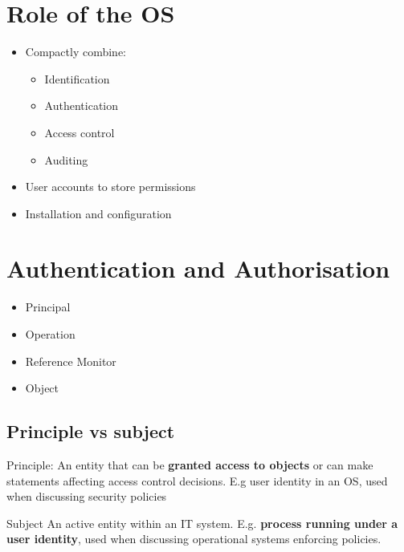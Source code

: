\documentclass{article}
\begin{document}
\tableofcontents

\newpage

\section{Role of the OS}
\begin{itemize}
  \item Compactly combine: 
  \begin{itemize}
    \item Identification 
    \item Authentication 
    \item Access control 
    \item Auditing
  \end{itemize} 
  \item User accounts to store permissions 
  \item Installation and configuration
\end{itemize}

\section{Authentication and Authorisation}
\begin{itemize}
  \item Principal
  \item Operation
  \item Reference Monitor
  \item Object
\end{itemize}

\subsection{Principle vs subject}
\begin{flushleft}
Principle: An entity that can be \textbf{granted access to objects} or can make statements affecting access control decisions. E.g user identity in an OS, used when discussing security policies
\end{flushleft}
\begin{flushleft}
Subject An active entity within an IT system. E.g. \textbf{process running under a user identity}, used when discussing operational systems enforcing policies.
\end{flushleft}
\end{document}
